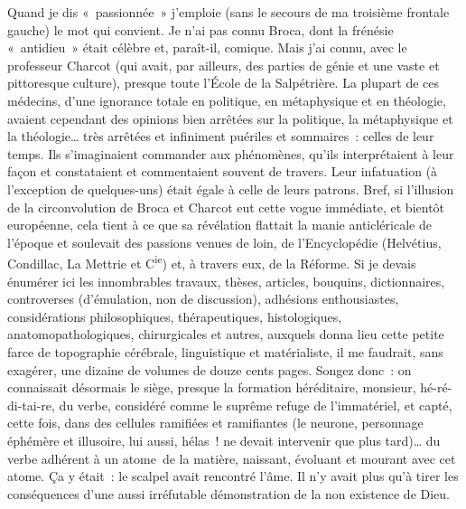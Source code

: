 \documentclass[french,twoside]{book} %
\begin{document}
Quand je dis « passionnée » j’emploie (sans le secours de ma troisième frontale gauche) le mot qui convient. Je n’ai pas connu Broca, dont la frénésie « antidieu » était célèbre et, paraît-il, comique. Mais j’ai connu, avec le professeur Charcot (qui avait, par ailleurs, des parties de génie et une vaste et pittoresque culture), presque toute l’École de la Salpétrière. La plupart de ces médecins, d’une ignorance totale en politique, en métaphysique et en théologie, avaient cependant des opinions bien arrêtées sur la politique, la métaphysique et la théologie… très arrêtées et infiniment puériles et sommaires : celles de leur temps. Ils s’imaginaient commander aux phénomènes, qu’ils interprétaient à leur façon et constataient et commentaient souvent de travers. Leur infatuation (à l’exception de quelques-uns) était égale à celle de leurs patrons. Bref, si l’illusion de la circonvolution de Broca et Charcot eut cette vogue immédiate, et bientôt européenne, cela tient à ce que sa révélation flattait la manie anticléricale de l’époque et soulevait des passions venues de loin, de l’Encyclopédie (Helvétius, Condillac, La Mettrie et C\textsuperscript{ie}) et, à travers eux, de la Réforme. Si je devais énumérer ici les innombrables travaux, thèses, articles, bouquins, dictionnaires, controverses (d’émulation, non de discussion), adhésions enthousiastes, considérations philosophiques, thérapeutiques, histologiques, anatomopathologiques, chirurgicales et autres, auxquels donna lieu cette petite farce de topographie cérébrale, linguistique et matérialiste, il me faudrait, sans exagérer, une dizaine de volumes de douze cents pages. Songez donc : on connaissait désormais le siège, presque la formation héréditaire, monsieur, hé-ré-di-tai-re, du verbe, considéré comme le suprême refuge de l’immatériel, et capté, cette fois, dans des cellules ramifiées et ramifiantes (le neurone, personnage éphémère et illusoire, lui aussi, hélas ! ne devait intervenir que plus tard)… du verbe adhérent à un atome de la matière, naissant, évoluant et mourant avec cet atome. Ça y était : le scalpel avait rencontré l’âme. Il n’y avait plus qu’à tirer les conséquences d’une aussi irréfutable démonstration de la non existence de Dieu.\par
\end{document}

